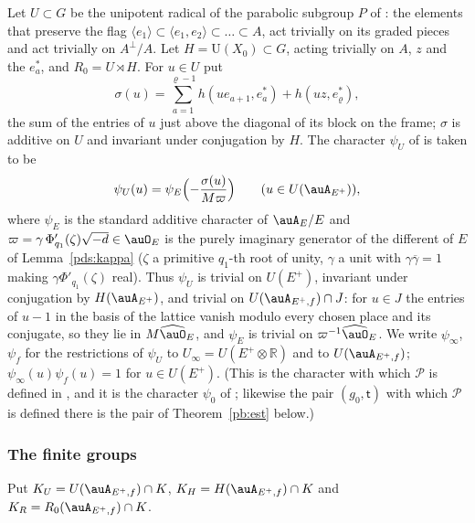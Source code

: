 \documentclass[10pt]{amsart}
\theoremstyle{definition}
\theoremstyle{remark}
\newcommand{\R}{\mathbb R}
\providecommand{\auP}{\mathcal P}
\providecommand{\auU}{\mathrm U}
\providecommand{\aubar}[1]{\overline{#1}}
\begin{document}
Let $U\subset G$ be the unipotent radical of the parabolic subgroup $P$ of {\cite[\S14.3]{P46}}:
the elements that preserve the flag $\langle e_1\rangle\subset\langle e_1,e_2\rangle\subset\dots
\subset A$, act trivially on its graded pieces and act trivially on $A^\perp/A$. Let
$H=\auU(X_0)\subset G$, acting trivially on $A$, $z$ and the $e_a^*$, and $R_0=U\rtimes H$. For
$u\in U$ put
\[
\sigma(u)=\sum_{a=1}^{\varrho-1}h(ue_{a+1},e_a^*)+h(uz,e_\varrho^*),
\]
the sum of the entries of $u$ just above the diagonal of its block on the frame; $\sigma$ is
additive on $U$ and invariant under conjugation by $H$. The character $\psi_U$ of
{\cite[\S14.3]{P46}} is taken to be
\begin{equation}\label{pb:eq-psi}
\psi_U(u)=\psi_E\Bigl(-\frac{\sigma(u)}{M\varpi}\Bigr)\qquad(u\in U(\auA_{E^+})),
\end{equation}
where $\psi_E$ is the standard additive character of $\auA_E/E$ and $\varpi=\gamma\,\Phi'_{q_1}(\zeta)\sqrt{-d}\in\auO_E$ is the purely imaginary generator of the different of $E$ of Lemma~\ref{pds:kappa} ($\zeta$ a primitive $q_1$-th root of unity, $\gamma$ a unit with $\gamma\aubar\gamma=1$ making $\gamma\Phi'_{q_1}(\zeta)$ real). Thus
$\psi_U$ is trivial on $U(E^+)$, invariant under conjugation by $H(\auA_{E^+})$, and trivial on
$U(\auA_{E^+,f})\cap J$: for $u\in J$ the entries of $u-1$ in the basis of the lattice vanish
modulo every chosen place and its conjugate, so they lie in $M\widehat{\auO}_E$, and $\psi_E$ is
trivial on $\varpi^{-1}\widehat{\auO}_E$. We write $\psi_\infty$, $\psi_f$ for the restrictions of
$\psi_U$ to $U_\infty=U(E^+\otimes\R)$ and to $U(\auA_{E^+,f})$; $\psi_\infty(u)\psi_f(u)=1$ for
$u\in U(E^+)$. (This is the character with which $\auP$ is defined in {\cite[\S14.3]{P46}}, and it
is the character $\psi_0$ of {\cite[\S5.1.3]{P49}}; likewise the pair $(g_0,\mathsf t)$ with which $\auP$
is defined there is the pair of Theorem~\ref{pb:est} below.)

\subsubsection*{The finite groups}
Put $K_U=U(\auA_{E^+,f})\cap K$, $K_H=H(\auA_{E^+,f})\cap K$ and $K_R=R_0(\auA_{E^+,f})\cap K$.
\end{document}
